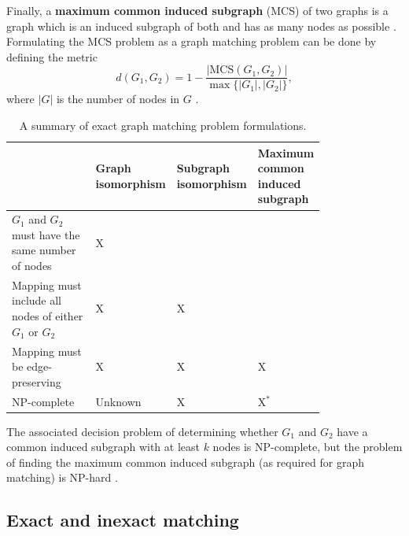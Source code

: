 \documentclass[12pt]{thesis}
\theoremstyle{plain}
\theoremstyle{definition}
\theoremstyle{remark}
\begin{document}
Finally, a \textbf{maximum common induced subgraph} (MCS) of two graphs is a graph which is an induced subgraph of both and has as many nodes as possible  \cite{wikiMaximumCommonSubgraph}. Formulating the MCS problem as a graph matching problem can be done by defining the metric \[d(G_1,G_2) = 1 - \frac{|\text{MCS}(G_1,G_2)|}{\max\{|G_1|,|G_2|\}},\] where $|G|$ is the number of nodes in $G$ \cite{Bunke_1998,Bunke_1997}.

\begin{table}[t!]
\centering
\setlength\extrarowheight{3pt}\setlength{\tabcolsep}{6pt}
\begin{tabular}{|L{0.3\linewidth}|C{0.14\linewidth}|C{0.14\linewidth}|C{0.21\linewidth}|}
\hline
 & Graph isomorphism & Subgraph isomorphism & Maximum common induced subgraph \\ \hline\hline
$G_1$ and $G_2$ must have the same number of nodes & X & & \\ \hline
Mapping must include all nodes of either $G_1$ or $G_2$ & X & X & \\ \hline
Mapping must be edge-preserving & X & X & X\hspace{6pt} \\ \hline
NP-complete & Unknown & X & X$^*$ \\ \hline
\end{tabular}
\flushleft\footnotesize *The associated decision problem of determining whether $G_1$ and $G_2$ have a common induced subgraph with at least $k$ nodes is NP-complete, but the problem of finding the maximum common induced subgraph (as required for graph matching) is NP-hard \cite{wikiMaximumCommonSubgraph}.
\caption{A summary of exact graph matching problem formulations.}
\label{NP_classifications}
\end{table}

\subsection{Exact and inexact matching}\label{section:exact_and_inexact_matching}
\end{document}
